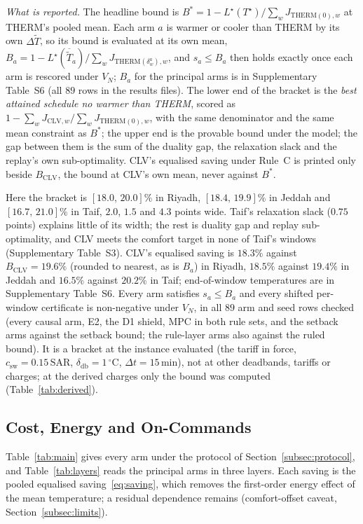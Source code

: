 \documentclass[3p,twocolumn,number]{elsarticle}
\newcommand{\deadband}{\delta_{\mathrm{db}}}
\newcommand{\csw}{c_{\mathrm{sw}}}
\newcommand{\SAR}{\text{SAR}}
\begin{document}
\emph{What is reported.} The headline bound is $B^{\ast}=1-L^{\star}(T^{\star})/\sum_wJ_{\mathrm{THERM}(0),w}$ at THERM's pooled mean. Each arm $a$ is warmer or cooler than THERM by its own $\Delta\tilde T$, so its bound is evaluated at its own mean, $B_a=1-L^{\star}(\overline{\tilde T}_a)/\sum_wJ_{\mathrm{THERM}(\delta^a_w),w}$, and $s_a\le B_a$ then holds exactly once each arm is rescored under $V_N$; $B_a$ for the principal arms is in Supplementary Table~S6 (all $89$ rows in the results files). The lower end of the bracket is the \emph{best attained schedule no warmer than THERM}, scored as $1-\sum_wJ_{\mathrm{CLV},w}/\sum_wJ_{\mathrm{THERM}(0),w}$, with the same denominator and the same mean constraint as $B^{\ast}$; the upper end is the provable bound under the model; the gap between them is the sum of the duality gap, the relaxation slack and the replay's own sub-optimality. CLV's equalised saving under Rule~C is printed only beside $B_{\mathrm{CLV}}$, the bound at CLV's own mean, never against $B^{\ast}$.

Here the bracket is $[18.0,\,20.0]\%$ in Riyadh, $[18.4,\,19.9]\%$ in Jeddah and $[16.7,\,21.0]\%$ in Taif, $2.0$, $1.5$ and $4.3$ points wide. Taif's relaxation slack ($0.75$ points) explains little of its width; the rest is duality gap and replay sub-optimality, and CLV meets the comfort target in none of Taif's windows (Supplementary Table~S3). CLV's equalised saving is $18.3\%$ against $B_{\mathrm{CLV}}=19.6\%$ (rounded to nearest, as is $B_a$) in Riyadh, $18.5\%$ against $19.4\%$ in Jeddah and $16.5\%$ against $20.2\%$ in Taif; end-of-window temperatures are in Supplementary Table~S6. Every arm satisfies $s_a\le B_a$ and every shifted per-window certificate is non-negative under $V_N$, in all $89$ arm and seed rows checked (every causal arm, E2, the D1 shield, MPC in both rule sets, and the setback arms against the setback bound; the rule-layer arms also against the ruled bound). It is a bracket at the instance evaluated (the tariff in force, $\csw=0.15\,\SAR$, $\deadband=1\,^\circ$C, $\Delta t=15\,$min), not at other deadbands, tariffs or charges; at the derived charges only the bound was computed (Table~\ref{tab:derived}).

\subsection{Cost, Energy and On-Commands}
\label{subsec:consumption}

Table~\ref{tab:main} gives every arm under the protocol of Section~\ref{subsec:protocol}, and Table~\ref{tab:layers} reads the principal arms in three layers. Each saving is the pooled equalised saving~\eqref{eq:saving}, which removes the first-order energy effect of the mean temperature; a residual dependence remains (comfort-offset caveat, Section~\ref{subsec:limits}).
\end{document}
